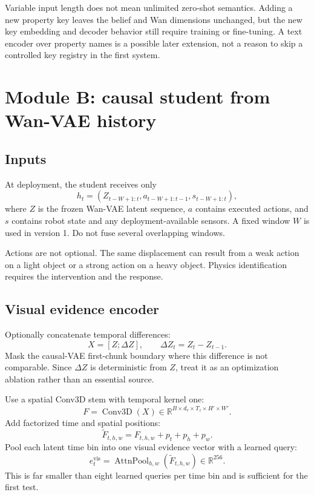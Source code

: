 \documentclass[11pt]{article}
\newcommand{\R}{\mathbb R}
\begin{document}
\begin{warningbox}
Variable input length does not mean unlimited zero-shot semantics.  Adding a
new property key leaves the belief and Wan dimensions unchanged, but the new
key embedding and decoder behavior still require training or fine-tuning.
A text encoder over property names is a possible later extension, not a reason
to skip a controlled key registry in the first system.
\end{warningbox}

\section{Module B: causal student from Wan-VAE history}

\subsection{Inputs}

At deployment, the student receives only
\begin{equation}
  h_t=\left(
  Z_{t-W+1:t},
  a_{t-W+1:t-1},
  s_{t-W+1:t}
  \right),
  \label{eq:student-history}
\end{equation}
where $Z$ is the frozen Wan-VAE latent sequence, $a$ contains executed actions,
and $s$ contains robot state and any deployment-available sensors.  A fixed
window $W$ is used in version 1.  Do not fuse several overlapping windows.

Actions are not optional.  The same displacement can result from a weak action
on a light object or a strong action on a heavy object.  Physics identification
requires the intervention and the response.

\subsection{Visual evidence encoder}

Optionally concatenate temporal differences:
\begin{equation}
  X=[Z;\Delta Z],
  \qquad
  \Delta Z_t=Z_t-Z_{t-1}.
\end{equation}
Mask the causal-VAE first-chunk boundary where this difference is not
comparable.  Since $\Delta Z$ is deterministic from $Z$, treat it as an
optimization ablation rather than an essential source.

Use a spatial Conv3D stem with temporal kernel one:
\begin{equation}
  F=\operatorname{Conv3D}(X)
  \in\R^{B\times d_v\times T_z\times H'\times W'}.
\end{equation}
Add factorized time and spatial positions:
\begin{equation}
  \widetilde F_{t,h,w}=F_{t,h,w}+p_t+p_h+p_w.
\end{equation}
Pool each latent time bin into one visual evidence vector with a learned query:
\begin{equation}
  e_t^{\mathrm{vis}}
  =\operatorname{AttnPool}_{h,w}(\widetilde F_{t,h,w})
  \in\R^{256}.
  \label{eq:spatial-pool}
\end{equation}
This is far smaller than eight learned queries per time bin and is sufficient
for the first test.
\end{document}
